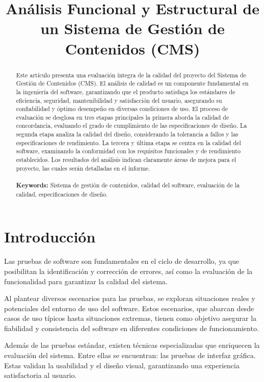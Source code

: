 \documentclass[10pt,times,twocolumn]{article}
\title{Análisis Funcional y Estructural de un Sistema de Gestión de Contenidos (CMS)}
\author
{
	\anonymize{Marco Acosta}\inst{1} 	
	\and
	\anonymize{Nilda Gómez}\inst{1}
	\and
	\anonymize{Nathaly Prieto}\inst{1}
	\and
	\anonymize{Elías Cristaldo}\inst{1}
}
\begin{document}
\maketitle

\begin{abstract}
Este artículo presenta una evaluación íntegra de la calidad del proyecto del Sistema de Gestión de Contenidos (CMS). El análisis de calidad es un componente fundamental en la ingeniería del software, garantizando que el producto satisfaga los estándares de eficiencia, seguridad, mantenibilidad y satisfacción del usuario, asegurando su confiabilidad y óptimo desempeño en diversas condiciones de uso\cite{swebok}. El proceso de evaluación se desglosa en tres etapas principales\cite{swebok} la primera aborda la calidad de concordancia, evaluando el grado de cumplimiento de las especificaciones de diseño. La segunda etapa analiza la calidad del diseño, considerando la tolerancia a fallos y las especificaciones de rendimiento. La tercera y última etapa se centra en la calidad del software, examinando la conformidad con los requisitos funcionales y de rendimiento establecidos. Los resultados del análisis indican claramente áreas de mejora para el proyecto, las cuales serán detalladas en el informe.\\ \\
{\bf Keywords:} Sistema de gestión de contenidos, calidad del software, evaluación de la calidad, especificaciones de diseño.\\
\end{abstract}

\section{Introducción}
Las pruebas de software son fundamentales en el ciclo de desarrollo, ya que posibilitan la identificación y corrección de errores, así como la evaluación de la funcionalidad para garantizar la calidad del sistema\cite{swebok}.

Al plantear diversos escenarios para las pruebas, se exploran situaciones reales y potenciales del entorno de uso del software. Estos escenarios, que abarcan desde casos de uso típicos hasta situaciones extremas, tienen como objetivo asegurar la fiabilidad y consistencia del software en diferentes condiciones de funcionamiento.

Además de las pruebas estándar, existen técnicas especializadas que enriquecen la evaluación del sistema. Entre ellas se encuentran: las pruebas de interfaz gráfica. Estas validan la usabilidad y el diseño visual, garantizando una experiencia satisfactoria al usuario.
\end{document}
